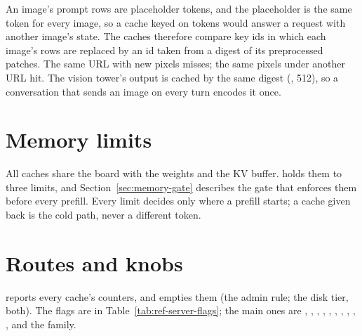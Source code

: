 An image's prompt rows are placeholder tokens, and the placeholder is the same token for every image, so a cache keyed on tokens would answer a request with another image's state. The caches therefore compare key ids in which each image's rows are replaced by an id taken from a digest of its preprocessed patches. The same URL with new pixels misses; the same pixels under another URL hit. The vision tower's output is cached by the same digest (, 512), so a conversation that sends an image on every turn encodes it once.

\section{Memory limits}

All caches share the board with the weights and the KV buffer.  holds them to three limits, and Section~\ref{sec:memory-gate} describes the gate that enforces them before every prefill. Every limit decides only where a prefill starts; a cache given back is the cold path, never a different token.

\section{Routes and knobs}

 reports every cache's counters, and  empties them (the admin rule;  the disk tier,  both). The flags are in Table~\ref{tab:ref-server-flags}; the main ones are , , , , , , , , , ,  and the  family.
